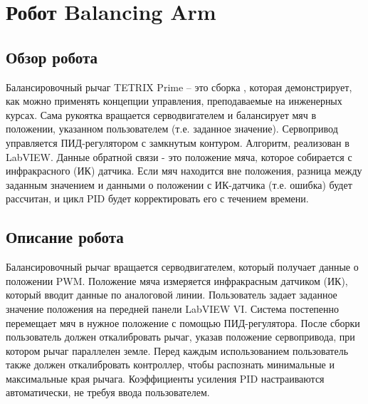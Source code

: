 \clearpage
\section{Робот Balancing Arm}
\subsection{Обзор робота}
Балансировочный рычаг TETRIX Prime -- это сборка
, которая демонстрирует, как можно применять концепции управления, преподаваемые
на инженерных курсах. Сама рукоятка
вращается серводвигателем и балансирует
мяч в положении, указанном пользователем (т.е.
заданное значение). Сервопривод управляется
ПИД-регулятором с замкнутым контуром.
Алгоритм, реализован в LabVIEW. Данные
обратной связи - это положение мяча, которое собирается
с инфракрасного (ИК) датчика. Если мяч находится вне
положения, разница между заданным значением
и данными о положении с ИК-датчика (т.е. ошибка)
будет рассчитан, и цикл PID будет корректировать его с течением времени.

\subsection{Описание робота}
Балансировочный рычаг вращается серводвигателем, который получает данные о положении PWM.
Положение мяча измеряется инфракрасным датчиком (ИК), который вводит данные по аналоговой линии.
Пользователь задает заданное значение положения на передней панели LabVIEW VI.
Система постепенно перемещает мяч в нужное положение с помощью ПИД-регулятора.
После сборки пользователь должен откалибровать рычаг, указав положение сервопривода, при котором рычаг
параллелен земле.
Перед каждым использованием пользователь также должен откалибровать контроллер, чтобы распознать минимальные и максимальные края
рычага.
Коэффициенты усиления PID настраиваются автоматически, не требуя ввода пользователем.

\newpage
